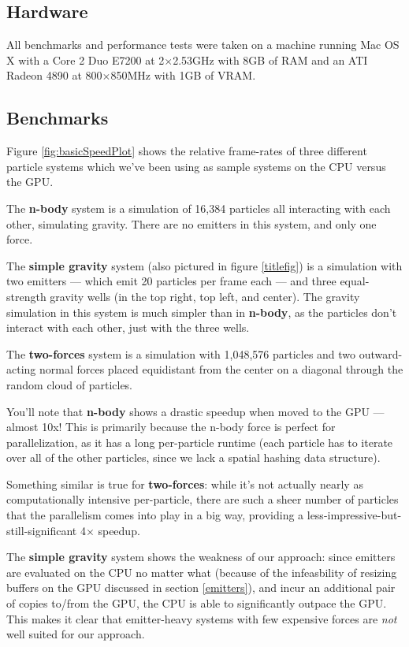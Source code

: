 \documentclass{acmsiggraph}
\begin{document}
\subsection{Hardware}

All benchmarks and performance tests were taken on a machine running Mac OS X with a Core 2 Duo E7200 at 2$\times$2.53GHz with 8GB of RAM and an ATI Radeon 4890 at 800$\times$850MHz with 1GB of VRAM.

\subsection{Benchmarks}

Figure \ref{fig:basicSpeedPlot} shows the relative frame-rates of three different particle systems which we've been using as sample systems on the CPU versus the GPU.

The {\bf n-body} system is a simulation of 16,384 particles all interacting with each other, simulating gravity. There are no emitters in this system, and only one force.

The {\bf simple gravity} system (also pictured in figure \ref{titlefig}) is a simulation with two emitters --- which emit 20 particles per frame each --- and three equal-strength gravity wells (in the top right, top left, and center). The gravity simulation in this system is much simpler than in {\bf n-body}, as the particles don't interact with each other, just with the three wells.

The {\bf two-forces} system is a simulation with 1,048,576 particles and two outward-acting normal forces placed equidistant from the center on a diagonal through the random cloud of particles.

You'll note that {\bf n-body} shows a drastic speedup when moved to the GPU --- almost 10x! This is primarily because the n-body force is perfect for parallelization, as it has a long per-particle runtime (each particle has to iterate over all of the other particles, since we lack a spatial hashing data structure).

Something similar is true for {\bf two-forces}: while it's not actually nearly as computationally intensive per-particle, there are such a sheer number of particles that the parallelism comes into play in a big way, providing a less-impressive-but-still-significant 4$\times$ speedup.

The {\bf simple gravity} system shows the weakness of our approach: since emitters are evaluated on the CPU no matter what (because of the infeasbility of resizing buffers on the GPU discussed in section \ref{emitters}), and incur an additional pair of copies to/from the GPU, the CPU is able to significantly outpace the GPU. This makes it clear that emitter-heavy systems with few expensive forces are {\it not} well suited for our approach.
\end{document}
